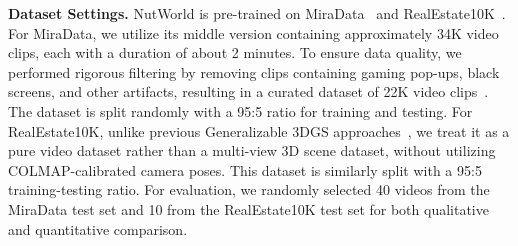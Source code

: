\noindent\textbf{Dataset Settings.} NutWorld is pre-trained on MiraData~\cite{ju2024miradatalargescalevideodataset} and RealEstate10K~\cite{zhou2018stereo}. For MiraData, we utilize its middle version containing approximately 34K video clips, each with a duration of about 2 minutes. To ensure data quality, we performed rigorous filtering by removing clips containing gaming pop-ups, black screens, and other artifacts, resulting in a curated dataset of 22K video clips~\cite{yi2023invariant}. The dataset is split randomly with a 95:5 ratio for training and testing. For RealEstate10K, unlike previous Generalizable 3DGS approaches~\cite{chen2025mvsplat, pixelsplat, zhang2024transplat}, we treat it as a pure video dataset rather than a multi-view 3D scene dataset, without utilizing COLMAP-calibrated camera poses. This dataset is similarly split with a 95:5 training-testing ratio. For evaluation, we randomly selected 40 videos from the MiraData test set and 10 from the RealEstate10K test set for both qualitative and quantitative comparison.
